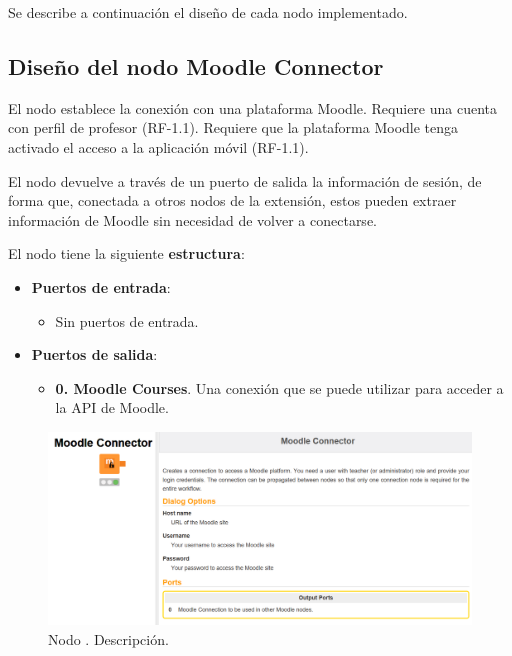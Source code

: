Se describe a continuación el diseño de cada nodo implementado. 

\newpage
\subsection{Diseño del nodo Moodle Connector}

El nodo  establece la conexión con una plataforma Moodle. Requiere una cuenta con perfil de profesor (RF-1.1). 
Requiere que la plataforma Moodle tenga activado el acceso a la aplicación móvil (RF-1.1). 
\

El nodo devuelve a través de un puerto de salida la información de sesión, de forma que, conectada a otros nodos de la extensión, 
estos pueden extraer información de Moodle sin necesidad de volver a conectarse.
\ 

El nodo tiene la siguiente \textbf{estructura}:

\begin{itemize}
	\item \textbf{Puertos de entrada}: 
    \begin{itemize}
		\item Sin puertos de entrada. 
   	\end{itemize}

	\item \textbf{Puertos de salida}: 
    \begin{itemize}
		\item \textbf{0. Moodle Courses}. Una conexión que se puede utilizar para acceder a la API de Moodle. 
   	\end{itemize}

\end{itemize}

\begin{figure}[!h]
	\centering
	\includegraphics[width=1\textwidth]{img/nodes_moodle_connector.png}
	\caption{Nodo . Descripción.}
	\label{fig:moodleconnector}
\end{figure}
\FloatBarrier


